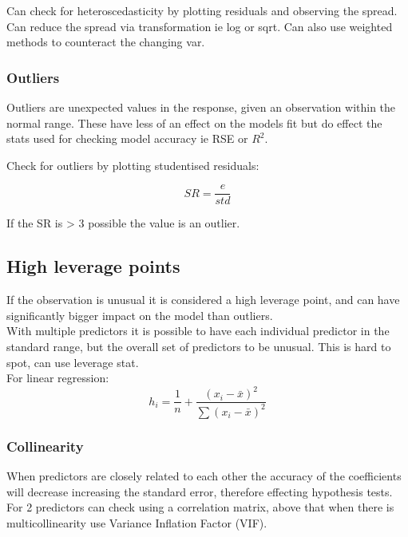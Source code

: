 \documentclass[11pt]{scrartcl} %
\begin{document}
Can check for heteroscedasticity by plotting residuals and observing the spread. Can reduce the spread
via transformation ie log or sqrt. Can also use weighted methods to counteract the changing var.

\subsubsection{Outliers}

Outliers are unexpected values in the response, given an observation within the normal range. These have less
of an effect on the models fit but do effect the stats used for checking model accuracy ie RSE or \(R^2\).

Check for outliers by plotting studentised residuals:

\begin{equation}
	SR = \frac{e}{std}	
\end{equation}

If the SR is > 3 possible the value is an outlier.

\subsection{High leverage points}

If the observation is unusual it is considered a high leverage point, and can have significantly bigger impact
on the model than outliers.\\

With multiple predictors it is possible to have each individual predictor in the standard range, but the overall set
of predictors to be unusual. This is hard to spot, can use leverage stat.\\

For linear regression:
\begin{equation}
	h_i = \frac{1}{n} + \frac{(x_i-\bar{x})^2}{\sum{(x_i-\bar{x})^2}}
\end{equation}

\subsubsection{Collinearity}

When predictors are closely related to each other the accuracy of the coefficients will decrease increasing
the standard error, therefore effecting hypothesis tests.\\

For 2 predictors can check using a correlation matrix, above that when there is multicollinearity use 
Variance Inflation Factor (VIF).
\end{document}
